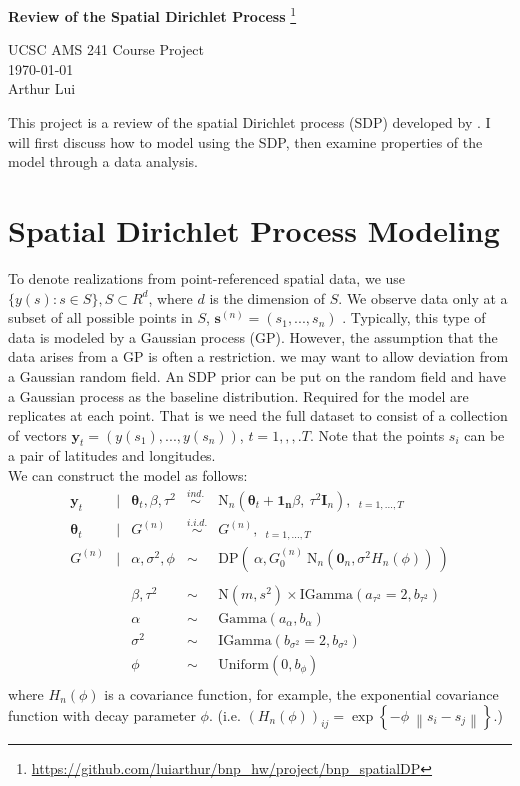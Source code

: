 \documentclass[11pt]{article}
\def\wl{\par \vspace{\baselineskip}\noindent}
\def\hline{ \textcolor{lgrey}{\hrulefill} }
\newcommand{\m}[1]{\mathbf{\bm{#1}}} %
\def\norm#1{\left\lVert#1\right\rVert}
\begin{document}
\begin{center}
  {\huge \textbf{Review of the Spatial Dirichlet Process}
    \footnote{\url{https://github.com/luiarthur/bnp_hw/project/bnp_spatialDP}}
  }\\
  \wl
  UCSC AMS 241 Course Project\\
  \noindent\today\\
  Arthur Lui\\
  \hline
\end{center}

\noindent
This project is a review of the spatial Dirichlet process (SDP) developed by
\cite{sdp}. I will first discuss how to model using the SDP, then examine
properties of the model through a data analysis.

\section{Spatial Dirichlet Process Modeling}
\noindent
To denote realizations from point-referenced spatial data, we use $\{y(s): s\in
S\}, S \subset R^d$, where $d$ is the dimension of $S$. We observe data only at
a subset of all possible points in $S$, $\m s^{(n)}=(s_1,...,s_n)$ . Typically,
this type of data is modeled by a Gaussian process (GP). However, the
assumption that the data arises from a GP is often a restriction.  we may
want to allow deviation from a Gaussian random field. An SDP prior can be put
on the random field and have a Gaussian process as the baseline distribution.
Required for the model are replicates at each point. That is we need the full
dataset to consist of a collection of vectors $\m y_t = (y(s_1),...,y(s_n))$,
$t=1,,,.T$. Note that the points $s_i$ can be a pair of latitudes and
longitudes.\\

\noindent
We can construct the model as follows:
\[
  \begin{array}{rclcl}
    \m y_t &|& \m\theta_t,\beta,\tau^2 &\overset{ind.}{\sim}&\text{N}_n(\m\theta_t+ \m{1_n}\beta,
    ~\tau^2\m I_n), ~~_{t=1,...,T}\\
    \m\theta_t &|& G^{(n)} &\overset{i.i.d.}{\sim}& G^{(n)}, ~~_{t=1,...,T} \\
    G^{(n)} &|& \alpha, \sigma^2, \phi &\sim&
      \text{DP}(~\alpha,G_0^{(n)}~\text{N}_n(\m 0_n,\sigma^2H_n(\phi)) ~) \\
    \\
            && \beta, \tau^2 &\sim& \text{N}(m,s^2) \times \text{IGamma}(a_{\tau^2}=2,b_{\tau^2}) \\
            && \alpha &\sim& \text{Gamma}(a_\alpha,b_\alpha) \\
            && \sigma^2 &\sim& \text{IGamma}(b_{\sigma^2}=2,b_{\sigma^2}) \\
            && \phi &\sim& \text{Uniform}(0,b_\phi) \\
  \end{array}
\]
where $H_n(\phi)$ is a covariance function, for example, the exponential
covariance function with decay parameter $\phi$. (i.e.  $(H_n(\phi))_{ij} =
\exp\left\{-\phi~\norm{s_i-s_j}\right\}$.)\\
\end{document}
